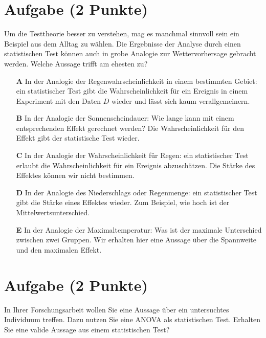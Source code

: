 \documentclass[a4paper, 9pt]{scrartcl}\usepackage[]{graphicx}\usepackage[]{xcolor}
\begin{document}
\section{Aufgabe \hfill (2 Punkte)}



Um die Testtheorie besser zu verstehen, mag es manchmal sinnvoll sein ein Beispiel aus dem Alltag zu wählen. Die Ergebnisse der Analyse durch einen statistischen Test können auch in grobe Analogie zur Wettervorhersage gebracht werden. Welche Aussage trifft am ehesten zu?



\begin{enumerate}
\item [\textbf{A} \msquare] In der Analogie der Regenwahrscheinlichkeit in einem bestimmten Gebiet: ein statistischer Test gibt die Wahrscheinlichkeit für ein Ereignis in einem Experiment mit den Daten $D$ wieder und lässt sich kaum verallgemeinern.
\item [\textbf{B} \msquare] In der Analogie der Sonnenscheindauer: Wie lange kann mit einem entsprechenden Effekt gerechnet werden? Die Wahrscheinlichkeit für den Effekt gibt der statistische Test wieder.
\item [\textbf{C} \msquare] In der Analogie der Wahrscheinlichkeit für Regen: ein statistischer Test erlaubt die Wahrscheinlichkeit für ein Ereignis abzuschätzen. Die Stärke des Effektes können wir nicht bestimmen.
\item [\textbf{D} \msquare] In der Analogie des Niederschlags oder Regenmenge: ein statistischer Test gibt die Stärke eines Effektes wieder. Zum Beispiel, wie hoch ist der Mittelwertsunterschied.
\item [\textbf{E} \msquare] In der Analogie der Maximaltemperatur: Was ist der maximale Unterschied zwischen zwei Gruppen. Wir erhalten hier eine Aussage über die Spannweite und den maximalen Effekt.
\end{enumerate}

\section{Aufgabe \hfill (2 Punkte)}



In Ihrer Forschungsarbeit wollen Sie eine Aussage über ein untersuchtes Individuum treffen. Dazu nutzen Sie eine ANOVA als statistischen Test. Erhalten Sie eine valide Aussage aus einem statistischen Test?
\end{document}
